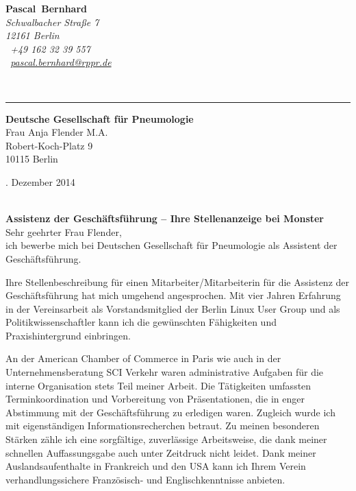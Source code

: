 \documentclass[11pt,a4paper]{article}
\def\firstname{Pascal}
\def\familyname{Bernhard}
\begin{document}
\sffamily   %
\hfill%
\begin{minipage}[t]{.6\textwidth}
	\raggedleft%
	{\bfseries {\color{firstnamecolor}\firstname}~{\color{familynamecolor}\familyname}}\\[.35ex]
	\small\itshape%
	Schwalbacher Straße 7\\
	12161 Berlin\\[.35ex]
	\Mobilefone~+49 162 32 39 557 \\
	\Letter~\href{mailto:pascal.bernhard@rppr.de}{pascal.bernhard@rppr.de}
\end{minipage}\\[0.5em]
%
{\color{firstnamecolor}\rule{\textwidth}{.25ex}}
%
\begin{minipage}[t]{.4\textwidth}
	\raggedright%
	\vspace*{1em}
	\textbf{Deutsche Gesellschaft für Pneumologie} \\
	Frau Anja Flender M.A.\\[.35ex]
	\small%
	Robert-Koch-Platz 9\\
	10115 Berlin
\end{minipage}
%
\hfill
%
\begin{minipage}[t]{.4\textwidth}
	. Dezember 2014
\end{minipage}\\[1em]


{\bfseries \color{familynamecolor}Assistenz der Geschäftsführung -- Ihre Stellenanzeige bei Monster}\\[0.75em]

Sehr geehrter Frau Flender,\\[0.5em]
%
ich bewerbe mich bei Deutschen Gesellschaft für Pneumologie als Assistent der Geschäftsführung.

Ihre Stellenbeschreibung für einen Mitarbeiter/Mitarbeiterin für die Assistenz der Geschäftsführung hat mich umgehend angesprochen. Mit vier Jahren Erfahrung in der Vereinsarbeit als Vorstandsmitglied der Berlin Linux User Group und als Politikwissenschaftler kann ich die gewünschten Fähigkeiten und Praxishintergrund einbringen.

An der American Chamber of Commerce in Paris wie auch in der Unternehmensberatung SCI Verkehr waren administrative Aufgaben für die interne Organisation stets Teil meiner Arbeit. Die Tätigkeiten umfassten Terminkoordination und Vorbereitung von Präsentationen, die in enger Abstimmung mit der Geschäftsführung zu erledigen waren. Zugleich wurde ich mit eigenständigen Informationsrecherchen betraut. Zu meinen besonderen Stärken zähle ich eine sorgfältige, zuverlässige Arbeitsweise, die dank meiner schnellen Auffassungsgabe auch unter Zeitdruck nicht leidet. Dank meiner Auslandsaufenthalte in Frankreich und den USA kann ich Ihrem Verein verhandlungssichere Französisch- und Englischkenntnisse anbieten.
\end{document}
